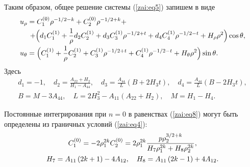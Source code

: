 Таким образом, общее решение системы (\ref{zai:eq5}) запишем в виде
\begin{equation}
\label{zai:eq8} 
\begin{array}{l}
\displaystyle
u_\rho = C_1^{(0)} \rho ^{ - 1
\mathord{\left/ {\vphantom {1 2}} \right. \kern-\nulldelimiterspace}
2 - k} + C_2^{(0)} \rho ^{ - 1 \mathord{\left/
{\vphantom {1 2}} \right. \kern-\nulldelimiterspace}
2 + k} + \vspace{1mm}\\
\displaystyle
\hspace{.5cm}
 + \Bigl( {d_1 C_1^{(1)} + \frac{1}{\rho }d_2 C_2^{\left( 1
\right)} + d_3 C_3^{(1)} \rho ^{ - 1 \mathord{\left/
{\vphantom {1 2}} \right. \kern-\nulldelimiterspace} 2 + t} + d_4
C_4^{(1)} \rho ^{ - 1 \mathord{\left/ {\vphantom {1 2}}
\right. \kern-\nulldelimiterspace} 2 - t} + H_\rho \rho ^2}
\Bigr)\cos \theta , \vspace{1mm} \\
\displaystyle
u_\theta = \Bigl( {C_1^{(1)} + \frac{1}{\rho }C_2^{\left( 1
\right)} + C_3^{(1)} \rho ^{ - 1 \mathord{\left/
{\vphantom {1 2}} \right. \kern-\nulldelimiterspace} 2 + t} +
C_4^{(1)} \rho ^{ - 1 \mathord{\left/ {\vphantom {1 2}}
\right. \kern-\nulldelimiterspace} 2 - t} + H_\theta \rho ^2}
\Bigr)\sin \theta .
\end{array}
\end{equation}
\noindent Здесь
\begin{gather*}
d_1 = - 1, \quad d_2 = \frac{A_{22} + H_{2}}{H_{1}- A_{44}} , \quad
d_3 = \frac{A_{44}}{L} \left({B + 2 H_{3} t} \right), \quad d_4 =
\frac{A_{44}}{L} \left({B - 2 H_{3} t} \right),
\\
B = M - 3 A_{44}, \quad L = 2H_{3}^2 - A_{11} \left( {A_{22} +
H_{2}} \right), \quad M = H_{1} - H_{4}.
\end{gather*}

Постоянные интегрирования при $n = 0$ в равенствах (\ref{zai:eq8}) могут
быть определены из граничных условий (\ref{zai:eq4}):
\begin{gather*}
C_1^{(0)} = - 2\rho _1^{2k} C_2^{(0)} =
2\rho_1^{2k} \frac{p \rho_2^{3 \mathord{\left/ {\vphantom {3 2}}
\right. \kern-\nulldelimiterspace} 2 + k}}{H_7 \rho _1^{2k} + H_8
\rho_2^{2k}},
\\
H_7 = A_{11} \left( {2k + 1} \right) - 4A_{12} , \quad H_8 = A_{11}
\left( {2k - 1} \right) + 4A_{12} .
\end{gather*}

